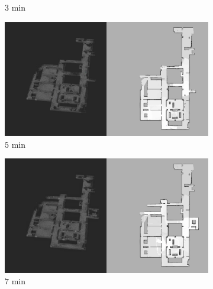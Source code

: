 \documentclass[smallextended]{svjour3}       %
\begin{document}
\begin{figure}[!t]
\begin{subfigure}[t]{0.38\columnwidth}
        		\caption{$3$ min}
		\vspace*{0.05\textwidth}
    	\end{subfigure}
	\begin{subfigure}[t]{0.38\columnwidth}
           	\centering
          	\includegraphics[trim={35cm 0cm 0cm 0cm}, clip, width=\textwidth]{Patrol_Split_Screen_5min.jpg}
        		\caption{$5$ min}
		\vspace*{0.05\textwidth}
    	\end{subfigure}
	\hspace*{0.05\textwidth}
    	\begin{subfigure}[t]{0.38\columnwidth}
           	\centering
          	\includegraphics[trim={35cm 0cm 0cm 0cm}, clip, width=\textwidth]{Patrol_Split_Screen_7min.jpg}
        		\caption{$7$ min}
		\vspace*{0.05\textwidth}
    	\end{subfigure}
    	\begin{subfigure}[t]{0.38\columnwidth}
           	\centering

\end{subfigure}
\end{figure}
\end{document}
